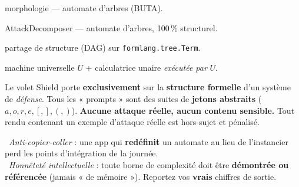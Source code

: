 \documentclass[11pt,a4paper]{scrartcl}
\begin{document}
\begin{center}
\end{center}
\begin{description}[leftmargin=1.4em,style=nextline,font=\normalfont\ttfamily]
  \item[apps/morpho] morphologie — automate d'arbres (BUTA).
  \item[apps/shield] AttackDecomposer — automate d'arbres, 100\,\% structurel.
  \item[apps/hashcons] partage de structure (DAG) sur \texttt{formlang.tree.Term}.
  \item[apps/mtu] machine universelle $U$ + calculatrice unaire \emph{exécutée par} $U$.
\end{description}

\begin{ethique}
Le volet Shield porte \textbf{exclusivement} sur la \textbf{structure formelle} d'un
système de \emph{défense}. Tous les « prompts » sont des suites de \textbf{jetons
abstraits} ($a,o,r,e,[,],(,)$). \textbf{Aucune attaque réelle, aucun contenu sensible.}
Tout rendu contenant un exemple d'attaque réelle est hors-sujet et pénalisé.
\end{ethique}

\begin{gate}
\textbullet\ \emph{Anti-copier-coller} : une app qui \textbf{redéfinit} un automate au
lieu de l'instancier perd les points d'intégration de la journée.\\
\textbullet\ \emph{Honnêteté intellectuelle} : toute borne de complexité doit être
\textbf{démontrée ou référencée} (jamais « de mémoire »). Reportez vos \textbf{vrais}
chiffres de sortie.
\end{gate}
\end{document}
